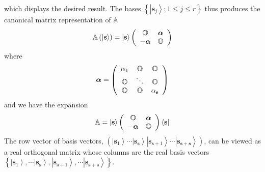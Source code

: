 \documentclass[aps,preprint]{revtex4}%
\begin{document}
which displays the desired result. The bases $\left\{  \left\vert
\mathbf{s}_{j}\right\rangle ;1\leq j\leq r\right\}  $ thus produces the
canonical matrix representation of $\mathbb{A}$
\begin{equation}
\mathbb{A}\left(  \left\vert \mathbf{s}\right\rangle \right)  =\left\vert
\mathbf{s}\right\rangle \left(
\begin{array}
[c]{cc}%
\mathbb{O} & \boldsymbol{\alpha}\\
-\boldsymbol{\alpha} & \mathbb{O}%
\end{array}
\right)
\end{equation}
where
\begin{equation}
\boldsymbol{\alpha}=\left(
\begin{array}
[c]{ccc}%
\alpha_{1} & \mathbb{O} & \mathbb{O}\\
\mathbb{O} & \ddots & \mathbb{O}\\
\mathbb{O} & \mathbb{O} & \alpha_{\mathbf{s}}%
\end{array}
\right)
\end{equation}
and we have the expansion
\begin{equation}
\mathbb{A}=\left\vert \mathbf{s}\right\rangle \left(
\begin{array}
[c]{cc}%
\mathbb{O} & \boldsymbol{\alpha}\\
-\boldsymbol{\alpha} & \mathbb{O}%
\end{array}
\right)  \left\langle \mathbf{s}\right\vert \label{reex}%
\end{equation}
The row vector of basis vectors, $\left(  \left\vert \mathbf{s}_{1}%
\right\rangle \cdots\left\vert \mathbf{s}_{\mathbf{s}}\right\rangle \left\vert
\mathbf{s}_{\mathbf{s}+1}\right\rangle \cdots\left\vert \mathbf{s}%
_{\mathbf{s}+\mathbf{s}}\right\rangle \right)  $, can be viewed as a real
orthogonal matrix whose columns are the real basis vectors $\left\{
\left\vert \mathbf{s}_{1}\right\rangle ,\cdots\left\vert \mathbf{s}%
_{\mathbf{s}}\right\rangle ,\left\vert \mathbf{s}_{\mathbf{s}+1}\right\rangle
,\cdots\left\vert \mathbf{s}_{\mathbf{s}+\mathbf{s}}\right\rangle \right\}  $.
\end{document}

